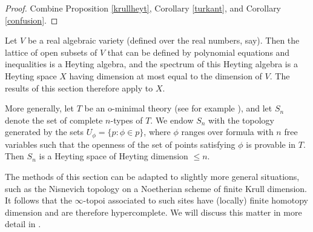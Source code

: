 \begin{proof}
Combine Proposition \ref{krullheyt}, Corollary \ref{turkant}, and Corollary \ref{confusion}.
\end{proof}

\begin{example}
Let $V$ be a real algebraic variety (defined over the real
numbers, say). Then the lattice of open subsets of $V$ that can be
defined by polynomial equations and inequalities is a Heyting
algebra, and the spectrum of this Heyting algebra is a Heyting
space $X$ having dimension at most equal to the dimension of $V$.
The results of this section therefore apply to $X$.

More generally, let $T$ be an o-minimal theory (see for example
\cite{lou}), and let $S_n$ denote the set of complete $n$-types of
$T$. We endow $S_n$ with the topology generated by the
sets $U_{\phi} = \{p: \phi \in p\}$, where $\phi$ ranges over
formula with $n$ free variables such that the openness of the set of points satisfying
$\phi$ is provable in $T$. Then $S_n$ is a Heyting
space of Heyting dimension $\leq n$.
\end{example}

\begin{remark}
The methods of this section can be adapted to slightly more
general situations, such as the Nisnevich topology on a Noetherian
scheme of finite Krull dimension. It follows that the
$\infty$-topoi associated to such sites have (locally) finite homotopy
dimension and are therefore hypercomplete.
We will discuss this matter in more detail in \cite{DAG}.
\end{remark}